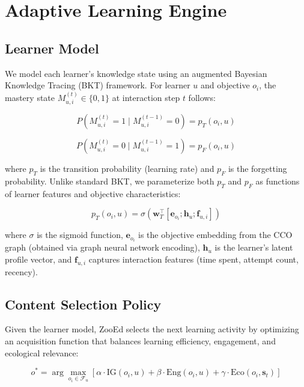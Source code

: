 \section{Adaptive Learning Engine}

\label{sec:adaptive}

\subsection{Learner Model}

We model each learner's knowledge state using an augmented Bayesian Knowledge Tracing (BKT) framework.
For learner $u$ and objective $o_i$, the mastery state $M_{u,i}^{(t)} \in \{0, 1\}$ at interaction step $t$ follows:

\begin{equation}
    P(M_{u,i}^{(t)} = 1 \mid M_{u,i}^{(t-1)} = 0) = p_T(o_i, u)
\end{equation}

\begin{equation}
    P(M_{u,i}^{(t)} = 0 \mid M_{u,i}^{(t-1)} = 1) = p_F(o_i, u)
\end{equation}

\noindent where $p_T$ is the transition probability (learning rate) and $p_F$ is the forgetting probability.
Unlike standard BKT, we parameterize both $p_T$ and $p_F$ as functions of learner features and objective characteristics:

\begin{equation}
    p_T(o_i, u) = \sigma\left(\mathbf{w}_T^\top [\mathbf{e}_{o_i}; \mathbf{h}_u; \mathbf{f}_{u,i}]\right)
\end{equation}

\noindent where $\sigma$ is the sigmoid function, $\mathbf{e}_{o_i}$ is the objective embedding from the CCO graph (obtained via graph neural network encoding), $\mathbf{h}_u$ is the learner's latent profile vector, and $\mathbf{f}_{u,i}$ captures interaction features (time spent, attempt count, recency).

\subsection{Content Selection Policy}

Given the learner model, ZooEd selects the next learning activity by optimizing an acquisition function that balances learning efficiency, engagement, and ecological relevance:

\begin{equation}
    o^* = \arg\max_{o_i \in \mathcal{F}_u} \left[\alpha \cdot \text{IG}(o_i, u) + \beta \cdot \text{Eng}(o_i, u) + \gamma \cdot \text{Eco}(o_i, \mathbf{s}_t)\right]
\end{equation}


